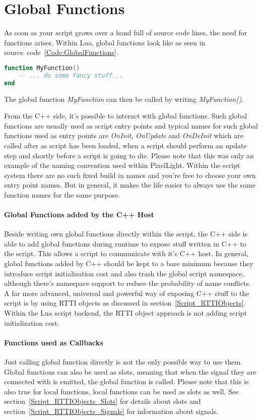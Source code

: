\section{Global Functions}
\label{Script_GlobalFunctions}
As soon as your script grows over a hand full of source code lines, the need for functions arises. Within Lua, global functions look like as seen in source~code~\ref{Code:GlobalFunctions}.
\begin{lstlisting}[language=lua,float=htb,label=Code:GlobalFunctions,caption={Global functions}]
function MyFunction()
	-- ... do some fancy stuff...
end
\end{lstlisting}
The global function \emph{MyFunction} can then be called by writing \emph{MyFunction()}.

From the C++ side, it's possible to interact with global functions. Such global functions are usually used as script entry points and typical names for such global functions used as entry points are \emph{OnInit}, \emph{OnUpdate} and \emph{OnDeInit} which are called after as script has been loaded, when a script should perform an update step and shortly before a script is going to die. Please note that this was only an example of the naming convention used within PixelLight. Within the script system there are no such fixed build in names and you're free to choose your own entry point names. But in general, it makes the life easier to always use the same function names for the same purpose.


\paragraph{Global Functions added by the C++ Host}
Beside writing own global functions directly within the script, the C++ side is able to add global functions during runtime to expose stuff written in C++ to the script. This allows a script to communicate with it's C++ host. In general, global functions added by C++ should be kept to a bare minimum because they introduce script initialization cost and also trash the global script namespace, although there's namespace support to reduce the probability of name conflicts. A far more advanced, universal and powerful way of exposing C++ stuff to the script is by using \ac{RTTI} objects as discussed in section~\ref{Script_RTTIObjects}. Within the Lua script backend, the \ac{RTTI} object approach is not adding script initialization cost.


\paragraph{Functions used as Callbacks}
Just calling global function directly is not the only possible way to use them. Global functions can also be used as slots, meaning that when the signal they are connected with is emitted, the global function is called. Please note that this is also true for local functions, local functions can be used as slots as well. See section~\ref{Script_RTTIObjects_Slots} for details about slots and section~\ref{Script_RTTIObjects_Signals} for information about signals.

